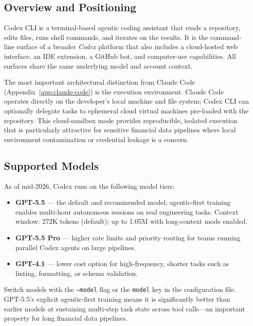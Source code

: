 \subsection{Overview and Positioning}
\label{app:codex:positioning}

Codex CLI is a terminal-based agentic coding assistant that reads a repository,
edits files, runs shell commands, and iterates on the results.  It is the
command-line surface of a broader \emph{Codex} platform that also includes a
cloud-hosted web interface, an IDE extension, a GitHub bot, and computer-use
capabilities.  All surfaces share the same underlying model and account context.

The most important architectural distinction from Claude Code
(Appendix~\ref{app:claude-code}) is the execution environment.  Claude Code
operates directly on the developer's local machine and file system; Codex CLI
can optionally delegate tasks to ephemeral cloud virtual machines pre-loaded
with the repository.  This cloud-sandbox mode provides reproducible, isolated
execution that is particularly attractive for sensitive financial data pipelines
where local environment contamination or credential leakage is a concern.

\subsection{Supported Models}
\label{app:codex:models}

As of mid-2026, Codex runs on the following model tiers:

\begin{itemize}
  \item \textbf{GPT-5.5} --- the default and recommended model; agentic-first
        training enables multi-hour autonomous sessions on real engineering tasks.
        Context window: 272K tokens (default); up to 1.05M with long-context mode
        enabled.
  \item \textbf{GPT-5.5 Pro} --- higher rate limits and priority routing for
        teams running parallel Codex agents on large pipelines.
  \item \textbf{GPT-4.1} --- lower cost option for high-frequency, shorter
        tasks such as linting, formatting, or schema validation.
\end{itemize}

Switch models with the \texttt{--model} flag or the \texttt{model} key in the
configuration file.  GPT-5.5's explicit agentic-first training means it is
significantly better than earlier models at sustaining multi-step task state
across tool calls---an important property for long financial data pipelines.

